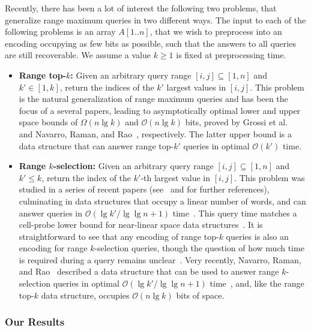 \documentclass[runningheads]{llncs}
\newcommand{\Oh}{\mathcal{O}}
\begin{document}
Recently, there has been a lot of interest the following two problems,
that generalize range maximum queries in two different ways.  The
input to each of the following problems is an array $A[1..n]$, that we
wish to preprocess into an encoding occupying as few bits as possible,
such that the answers to all queries are still recoverable.  We assume
a value $k \ge 1$ is fixed at preprocessing time.
\begin{itemize}

\item \textbf{Range top-$k$:} Given an arbitrary query range $[i,j]
  \subseteq [1,n]$ and $k' \in [1,k]$, return the indices of the $k'$
  largest values in $[i,j]$.  This problem is the natural
  generalization of range maximum queries and has been the focus of a
  several papers, leading to asymptotically optimal lower and upper
  space bounds of $\Omega(n \lg k)$ and $\Oh(n \lg k)$ bits, proved by
  Grossi et al.~\cite{GINRS13} and Navarro, Raman, and
  Rao~\cite{NRS14}, respectively.  The latter upper bound is a data
  structure that can answer range top-$k'$ queries in optimal
  $\Oh(k')$ time.

\item \textbf{Range $k$-selection:} Given an arbitrary query range
  $[i,j] \subseteq [1,n]$ and $k' \leq k$, return the index of the
  $k'$-th largest value in $[i,j]$.  This problem was studied in a
  series of recent papers (see~\cite{GPT09} and \cite{BGJS10} for
  further references), culminating in data structures that occupy a
  linear number of words, and can answer queries in $\Oh(\lg k' / \lg
  \lg n + 1)$ time~\cite{CW13}.  This query time matches a cell-probe
  lower bound for near-linear space data structures~\cite{JL11}. It is
  straightforward to see that any encoding of range top-$k$ queries is
  also an encoding for range $k$-selection queries, though the
  question of how much time is required during a query remains
  unclear~\cite{NRS14}.  Very recently, Navarro, Raman, and
  Rao~\cite{NRS14} described a data structure that can be used to
  answer range $k$-selection queries in optimal $\Oh(\lg k' / \lg \lg n
  + 1)$ time~\cite{NRS14}, and, like the range top-$k$ data structure,
  occupies $\Oh(n \lg k)$ bits of space.
\end{itemize}


\subsubsection{Our Results}
\end{document}
